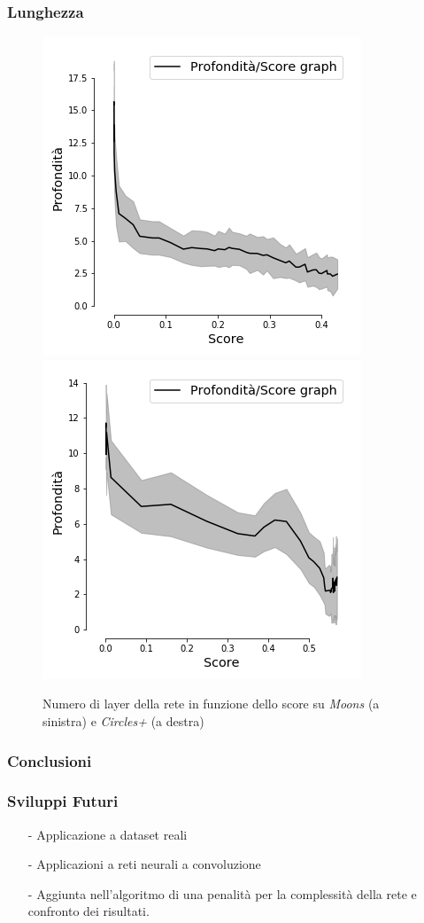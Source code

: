 \documentclass{beamer}
\begin{document}
\begin{frame}
 \frametitle{Lunghezza}
 \begin{figure}
  \includegraphics[scale = 0.42]{images/depth_Score_moons.png}
  \includegraphics[scale = 0.42]{images/depth_Score_circles+.png}
  \caption{\large Numero di layer della rete in funzione dello score su \textit{Moons} (a sinistra) e \textit{Circles+} (a destra)}
 \end{figure}

\end{frame}


\begin{frame}
 \frametitle{Conclusioni}
\end{frame}

\begin{frame}
 \large
 \frametitle{Sviluppi Futuri}
 \begin{enumerate}
  \item [-] Applicazione a dataset reali
  \item [-] Applicazioni a reti neurali a convoluzione
  \item [-] Aggiunta nell'algoritmo di una penalità per la complessità della rete e confronto dei risultati.
 \end{enumerate}

\end{frame}
\end{document}

